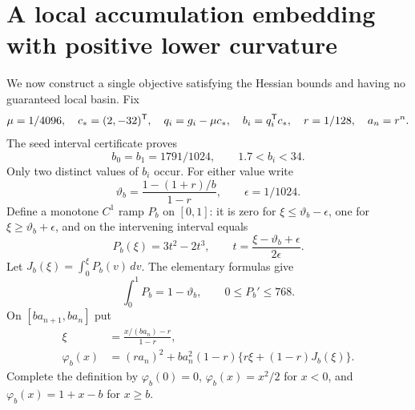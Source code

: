\setcounter{section}{4}
\setcounter{theorem}{2}
\setcounter{lemma}{1}
\setcounter{corollary}{0}
\setcounter{proposition}{0}
\setcounter{remark}{0}
\setcounter{equation}{7}


\section{A local accumulation embedding with positive lower curvature}
We now construct a single objective satisfying the Hessian bounds and having no guaranteed local basin. Fix
\[
 \mu=1/4096,\quad c_*=(2,-32)^{\mathsf T},\quad
 q_i=g_i-\mu c_*,\quad b_i=q_i^{\mathsf T} c_*,\quad r=1/128,\quad a_n=r^n.
\]
The seed interval certificate proves
\[
 b_0=b_1=1791/1024,\qquad 1.7<b_i<34.
\]
Only two distinct values of $b_i$ occur. For either value write
\[
 \vartheta_b=\frac{1-(1+r)/b}{1-r},\qquad \epsilon=1/1024.
\]
Define a monotone $C^1$ ramp $P_b$ on $[0,1]$: it is zero for $\xi\le\vartheta_b-\epsilon$, one for $\xi\ge\vartheta_b+\epsilon$, and on the intervening interval equals
\[
 P_b(\xi)=3t^2-2t^3,\qquad t=\frac{\xi-\vartheta_b+\epsilon}{2\epsilon}.
\]
Let $J_b(\xi)=\int_0^\xi P_b(v)\,dv$. The elementary formulas give
\[
 \int_0^1P_b=1-\vartheta_b,\qquad 0\le P_b'\le768.
\]
On $[ba_{n+1},ba_n]$ put
\begin{align}
 \xi&=\frac{x/(ba_n)-r}{1-r},\\
 \varphi_b(x)&=(ra_n)^2+ba_n^2(1-r)
 \{r\xi+(1-r)J_b(\xi)\}.\label{L:eq:scalar}
\end{align}
Complete the definition by $\varphi_b(0)=0$, $\varphi_b(x)=x^2/2$ for $x<0$, and $\varphi_b(x)=1+x-b$ for $x\ge b$.


